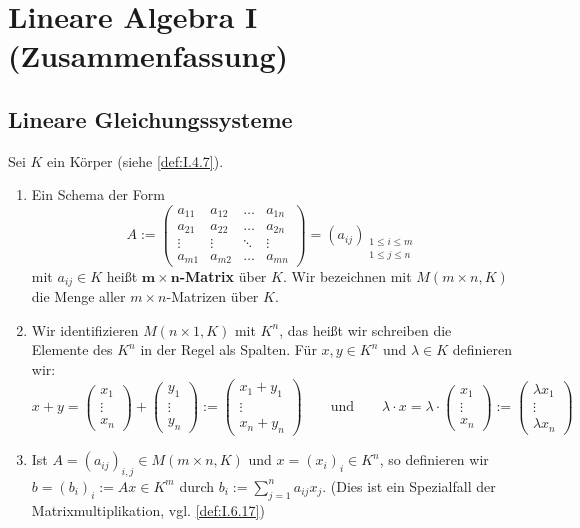 \chapter{Lineare Algebra I (Zusammenfassung)} %
\label{cha:1}
\setcounter{section}{2}
\section{Lineare Gleichungssysteme}
\setcounter{definition}{4}
\begin{definition}[Matrix]
	\label{def:I.3.5}
	Sei $K$ ein Körper (siehe \autoref{def:I.4.7}).
	\begin{enumerate}[(1)]
		\item Ein Schema der Form
		\[
			A := \begin{pmatrix}
				a_{11} & a_{12} & \dots & a_{1n} \\
				a_{21} & a_{22} & \dots & a_{2n} \\
				\vdots & \vdots & \ddots & \vdots \\
				a_{m1} & a_{m2} & \dots & a_{mn}
			\end{pmatrix} = (a_{ij})_{\substack{1 \leq i \leq m \\ 1 \leq j \leq n}}
		\]
		mit $a_{ij} \in K$ heißt $\bm{m \times n}$\textbf{-Matrix} über $K$. 
		Wir bezeichnen mit $M(m \times n,K)$ die Menge aller $m \times n$-Matrizen über $K$.
		\item Wir identifizieren $M(n \times 1,K)$ mit $K^n$, das heißt wir schreiben die Elemente des $K^n$ in der Regel als Spalten.
		Für $x,y \in K^n$ und $\lambda \in K$ definieren wir:
		\[
			x+y = \begin{pmatrix} x_1 \\ \vdots \\ x_n \end{pmatrix} + \begin{pmatrix} y_1 \\ \vdots \\ y_n \end{pmatrix} := \begin{pmatrix} x_1 + y_1 \\ \vdots \\ x_n + y_n \end{pmatrix} \qquad \text{und} \qquad \lambda \cdot x = \lambda \cdot \begin{pmatrix} x_1 \\ \vdots \\ x_n \end{pmatrix} := \begin{pmatrix} \lambda x_1 \\ \vdots \\ \lambda x_n \end{pmatrix}
		\]
		\item Ist $A = (a_{ij})_{i,j} \in M(m \times n,K)$ und $x = (x_i)_i \in K^n$, so definieren wir $b = (b_i)_i := Ax \in K^m$ durch $b_i := \sum\limits_{j=1}^n a_{ij}x_j$.
		(Dies ist ein Spezialfall der Matrixmultiplikation, vgl. \autoref{def:I.6.17})
	\end{enumerate}
\end{definition}

